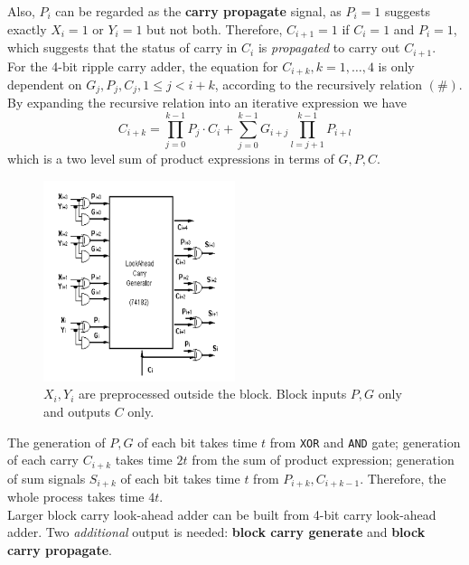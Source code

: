 \documentclass[12pt]{article}
\theoremstyle{definition}
\begin{document}
Also, $P_i$ can be regarded as the \textbf{carry propagate} signal, as $P_i= 1$ suggests exactly $X_i=1$ or $ Y_i = 1$ but not both. Therefore, $C_{i+1} = 1$ if $C_i = 1$ and $P_i = 1$, which suggests that the status of carry in $C_i$ is \textit{propagated} to carry out $C_{i+1}$.\\

For the 4-bit ripple carry adder, the equation for $C_{i+k}, k = 1,\ldots, 4$ is only dependent on $G_j,P_j,C_j, 1\leq j< i+k$, according to the recursively relation $(\#)$. 
By expanding the recursive relation into an iterative expression we have
\[
C_{i+k}=\prod_{j=0}^{k-1} P_j\cdot C_i+\sum_{j=0}^{k-1}G_{i+j}\prod_{l = j+1}^{k-1}P_{i+l}
\]
which is a two level sum of product expressions in terms of $G,P,C$.\\
\begin{figure}[h]
\centering
\includegraphics[width = 0.5\textwidth]{6_14.png}
\caption{$X_i,Y_i$ are preprocessed outside the block. Block inputs $P,G$ only and outputs $C$ only.}
\end{figure}

The generation of $P,G$ of each bit takes time $t$ from \texttt{XOR} and \texttt{AND} gate; generation of each carry $C_{i+k}$ takes time $2t$ from the sum of product expression; generation of sum signals $S_{i+k}$ of each bit takes time $t$ from $P_{i+k},C_{i+k-1}$. Therefore, the whole process takes time $4t$.\\

Larger block carry look-ahead adder can be built from 4-bit carry look-ahead adder. Two \textit{additional} output is needed: \textbf{block carry generate} and \textbf{block carry propagate}.\\
\end{document}
